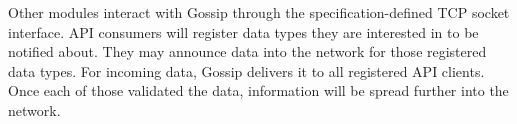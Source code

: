 Other modules interact with Gossip through the specification-defined TCP socket interface.
API consumers will register data types they are interested in to be notified about.
They may announce data into the network for those registered data types.
For incoming data, Gossip delivers it to all registered API clients.
Once each of those validated the data, information will be spread further into the network.
